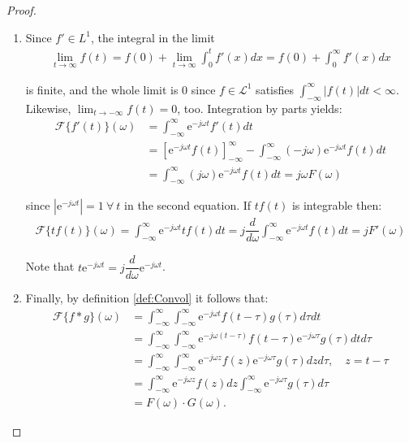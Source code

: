 \begin{proof}
\begin{enumerate}[label=(\alph*)]
\item Since $f' \in L^1$, the integral in the limit
\begin{align*}
\lim_{t \to \infty} f(t) = f(0) + \lim_{t\to\infty} \int_0^t f'(x) dx = f(0) + \int_0^\infty f'(x) dx
\end{align*}

is finite, and the whole limit is 0 since $f \in \mathcal{L}^1$ satisfies $\int_{-\infty}^\infty |f(t)| dt < \infty$. Likewise, $\displaystyle{\lim_{t \to -\infty} f(t) = 0}$, too. Integration by parts yields:
\begin{align*}
\mathcal{F}\{f'(t)\}(\omega) &= \int_{-\infty}^\infty \text{e}^{-j \omega t} f'(t) dt \\
&= \left[ \text{e}^{-j\omega t} f(t) \right]_{-\infty}^\infty - \int_{-\infty}^\infty (-j \omega) \text{e}^{-j \omega t} f(t) dt \\
&= \int_{-\infty}^\infty (j \omega) \text{e}^{-j \omega t} f(t) dt = j\omega F(\omega)
\end{align*}

since $|\text{e}^{-j\omega t}| = 1 \ \forall \ t$ in the second equation. If $tf(t)$ is integrable then:
\begin{align*}
\mathcal{F}\{tf(t)\}(\omega) = \int_{-\infty}^\infty \text{e}^{-j \omega t} t f(t) dt = j \dfrac{d}{d\omega} \int_{-\infty}^\infty \text{e}^{-j \omega t} f(t) dt = j F'(\omega)
\end{align*}

Note that $t \text{e}^{-j \omega t} = j \dfrac{d}{d\omega} \text{e}^{-j\omega t}$.

\item Finally, by definition \ref{def:Convol} it follows that:
\begin{align*}
\mathcal{F}\{f*g\}(\omega) &= \int_{-\infty}^\infty \int_{-\infty}^\infty \text{e}^{-j \omega t} f(t - \tau) g(\tau) d\tau dt \\
&= \int_{-\infty}^\infty \int_{-\infty}^\infty \text{e}^{-j\omega(t-\tau)} f(t-\tau) \text{e}^{-j\omega \tau} g(\tau) dt d\tau \\
&= \int_{-\infty}^\infty \int_{-\infty}^\infty \text{e}^{-j\omega z} f(z) \text{e}^{-j\omega \tau} g(\tau) dz d\tau, \quad z = t - \tau \\
&= \int_{-\infty}^\infty \text{e}^{-j\omega z} f(z) dz \int_{-\infty}^\infty \text{e}^{-j\omega \tau} g(\tau) d\tau \\
&= F(\omega) \cdot G(\omega).
\end{align*}
\end{enumerate}
\end{proof}

